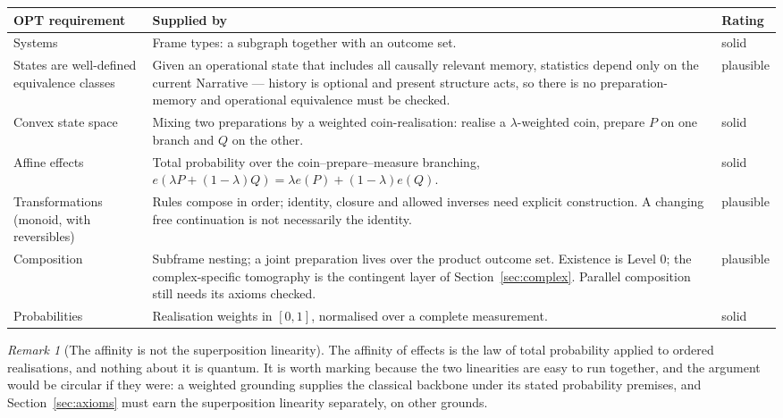 \documentclass[11pt,a4paper]{article}
\theoremstyle{remark}\newtheorem{remark}[definition]{Remark}
\begin{document}
\begin{center}\small
\begin{tabular}{@{}>{\raggedright\arraybackslash}p{}
                >{\raggedright\arraybackslash}p{}
                >{\raggedright\arraybackslash}p{}@{}}
\toprule
\textbf{OPT requirement} & \textbf{Supplied by} & \textbf{Rating}\\
\midrule
Systems & Frame types: a subgraph together with an outcome set. & solid\\
States are well-defined equivalence classes & Given an operational state that includes all causally relevant memory, statistics depend only on the current Narrative --- history is optional and present structure acts, so there is no preparation-memory and operational equivalence must be checked. & plausible\\
Convex state space & Mixing two preparations by a weighted coin-realisation: realise a $\lambda$-weighted coin, prepare $P$ on one branch and $Q$ on the other. & solid\\
Affine effects & Total probability over the coin--prepare--measure branching, $e(\lambda P+(1-\lambda)Q)=\lambda e(P)+(1-\lambda)e(Q)$. & solid\\
Transformations (monoid, with reversibles) & Rules compose in order; identity, closure and allowed inverses need explicit construction. A changing free continuation is not necessarily the identity. & plausible\\
Composition & Subframe nesting; a joint preparation lives over the product outcome set. Existence is Level 0; the complex-specific tomography is the contingent layer of Section~\ref{sec:complex}. Parallel composition still needs its axioms checked. & plausible\\
Probabilities & Realisation weights in $[0,1]$, normalised over a complete measurement. & solid\\
\bottomrule
\end{tabular}
\end{center}

\begin{remark}[The affinity is not the superposition linearity]\label{rem:affine}
The affinity of effects is the law of total probability applied to ordered
realisations, and nothing about it is quantum. It is worth marking because the
two linearities are easy to run together, and the argument would be circular if
they were: a weighted grounding supplies the classical backbone under its stated probability premises, and Section~\ref{sec:axioms}
must earn the superposition linearity separately, on other grounds.
\end{remark}
\end{document}
